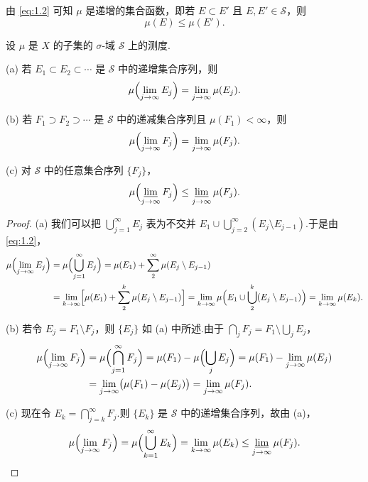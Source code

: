 由 \eqref{eq:1.2} 可知 $\mu$ 是递增的集合函数，即若 $E\subset E'$ 且 $E,E'\in\mathcal{S}$，则
\[
  \mu(E)\leq\mu(E').
\]

\begin{theorem}\label{thm:1.1}
设 $\mu$ 是 $X$ 的子集的 $\sigma$-域 $\mathcal{S}$ 上的测度.

(a) 若 $E_1\subset E_2\subset\cdots$ 是 $\mathcal{S}$ 中的递增集合序列，则
\[
  \mu\Bigl(\lim_{j\to\infty}E_j\Bigr)=\lim_{j\to\infty}\mu(E_j).
\]

(b) 若 $F_1\supset F_2\supset\cdots$ 是 $\mathcal{S}$ 中的递减集合序列且 $\mu(F_1)<\infty$，则
\[
  \mu\Bigl(\lim_{j\to\infty}F_j\Bigr)=\lim_{j\to\infty}\mu(F_j).
\]

(c) 对 $\mathcal{S}$ 中的任意集合序列 $\{F_j\}$，
\[
  \mu\Bigl(\varliminf_{j\to\infty}F_j\Bigr)\leq\varliminf_{j\to\infty}\mu(F_j).
\]
\end{theorem}

\begin{proof}
(a) 我们可以把 $\bigcup_{j=1}^{\infty}E_j$ 表为不交并 $E_1\cup\bigcup_{j=2}^{\infty}(E_j\setminus E_{j-1})$.于是由 \eqref{eq:1.2}，
\[
\begin{aligned}
  \mu\Bigl(\lim_{j\to\infty}E_j\Bigr)
    &=\mu\Bigl(\bigcup_{j=1}^{\infty}E_j\Bigr)
     =\mu(E_1)+\sum_{2}^{\infty}\mu(E_j\setminus E_{j-1})\\
    &=\lim_{k\to\infty}\Bigl[\mu(E_1)+\sum_{2}^{k}\mu(E_j\setminus E_{j-1})\Bigr]
     =\lim_{k\to\infty}\mu\Bigl(E_1\cup\bigcup_{2}^{k}(E_j\setminus E_{j-1})\Bigr)
     =\lim_{k\to\infty}\mu(E_k).
\end{aligned}
\]

(b) 若令 $E_j=F_1\setminus F_j$，则 $\{E_j\}$ 如 (a) 中所述.由于 $\bigcap_{j}F_j=F_1\setminus\bigcup_{j}E_j$，
\begin{align*}
  \mu\Bigl(\lim_{j\to\infty}F_j\Bigr)
  &=\mu\Bigl(\bigcap_{j=1}^{\infty}F_j\Bigr)
  =\mu(F_1)-\mu\Bigl(\bigcup_{j}E_j\Bigr)
  =\mu(F_1)-\lim_{j\to\infty}\mu(E_j)\\
  &=\lim_{j\to\infty}\bigl(\mu(F_1)-\mu(E_j)\bigr)
  =\lim_{j\to\infty}\mu(F_j).
\end{align*}

(c) 现在令 $E_k=\bigcap_{j=k}^{\infty}F_j$.则 $\{E_k\}$ 是 $\mathcal{S}$ 中的递增集合序列，故由 (a)，
\[
  \mu\Bigl(\lim_{j\to\infty}F_j\Bigr)
  =\mu\Bigl(\bigcup_{k=1}^{\infty}E_k\Bigr)
  =\lim_{k\to\infty}\mu(E_k)
  \leq\varliminf_{j\to\infty}\mu(F_j). \qedhere
\]
\end{proof}

